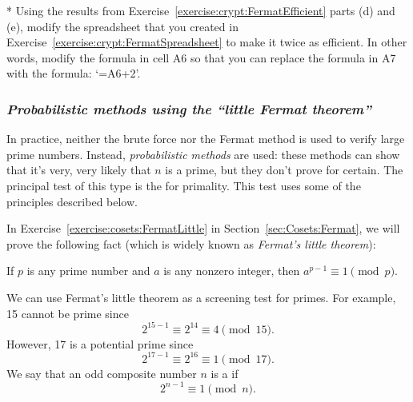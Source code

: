 \begin{exercise}{}
* Using the results from Exercise~\ref{exercise:crypt:FermatEfficient} parts (d) and (e), modify the spreadsheet that you created in Exercise~\ref{exercise:crypt:FermatSpreadsheet} to make it twice as efficient.  In other words, modify the formula in cell A6 so that you can replace the formula in A7 with the formula: `=A6+2'.
\end{exercise}

\subsubsection*{\emph{Probabilistic methods using the ``little Fermat theorem''}}
In practice, neither the brute force nor the Fermat method is used to verify large prime numbers. Instead, 
\emph{probabilistic methods} are used: these methods can show that it's very, very likely that $n$ is a prime, but they don't prove for certain. The principal test of this type is the   for primality.  This test uses some of the principles described  below.	 
 
In Exercise~\ref{exercise:cosets:FermatLittle} in Section~\ref{sec:Cosets:Fermat}, we will prove the following fact (which is widely known as \emph{Fermat's little theorem}): 
\medskip

If  $p$ is any prime number and $a$ is any nonzero integer, then $a^{p-1} \equiv 1 \pmod{p}$.  
\medskip

We can use Fermat's little theorem as a screening test for primes. For example, 15 cannot be prime since
$$
2^{15-1} \equiv 2^{14} \equiv 4 \pmod{15}.
$$
However, 17 is a potential prime since
$$
2^{17-1} \equiv 2^{16} \equiv 1 \pmod{17}.
$$
We say that an odd composite number $n$ is a  if 
$$
2^{n-1} \equiv 1 \pmod{n}.
$$

